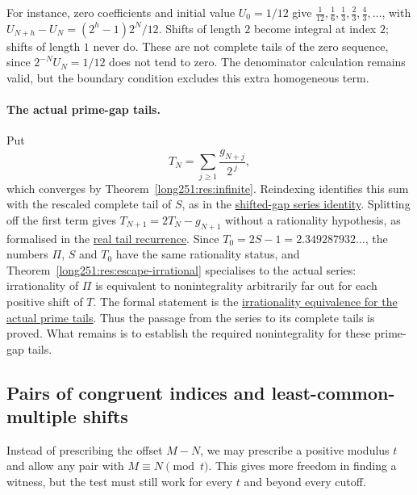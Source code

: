 \documentclass[11pt]{article}
\makeatletter
\newcommand{\compatlabel}[1]{\ltx@label{#1}}
\makeatother
\begin{document}
For instance, zero coefficients and initial value $U_0=1/12$ give
$\tfrac1{12},\tfrac16,\tfrac13,\tfrac23,\tfrac43,\ldots$, with
$U_{N+h}-U_N=(2^h-1)2^N/12$.  Shifts of length $2$ become integral
at index $2$; shifts of length $1$ never do.  These are not complete
tails of the zero sequence, since $2^{-N}U_N=1/12$ does not tend to
zero.  The denominator calculation remains valid, but the boundary
condition excludes this extra homogeneous term.

\paragraph{The actual prime-gap tails.}
Put
\[
 T_N=\sum_{j\ge1}\frac{g_{N+j}}{2^{\,j}},
\]
which converges by Theorem~\ref{long251:res:infinite}.  Reindexing identifies
this sum with the rescaled complete tail of $S$, as in the
\href{https://github.com/wcook04/plectis-erdos/blob/3d6d938d696fed0fb71dd55115a18a73738ff223/lean/ErdosProblems/Erdos251/RealPrimeGapTail.lean\#L31}{shifted-gap
series identity}.  Splitting off the first term gives
$T_{N+1}=2T_N-g_{N+1}$ without a rationality hypothesis, as formalised in the
\href{https://github.com/wcook04/plectis-erdos/blob/3d6d938d696fed0fb71dd55115a18a73738ff223/lean/ErdosProblems/Erdos251/RealPrimeGapTail.lean\#L48}{real
tail recurrence}.  Since $T_0=2S-1=2.349287932\ldots$, the numbers $\Pi$, $S$
and $T_0$ have the same rationality status, and
Theorem~\ref{long251:res:escape-irrational} specialises to the actual series:
irrationality of $\Pi$ is equivalent to nonintegrality arbitrarily far out
for each positive shift of $T$.  The formal statement is the
\href{https://github.com/wcook04/plectis-erdos/blob/3d6d938d696fed0fb71dd55115a18a73738ff223/lean/ErdosProblems/Erdos251/RealPrimeGapTail.lean\#L73}{irrationality equivalence for the actual prime tails}.  Thus the passage from the series to its complete tails
is proved.  What remains is to establish the required nonintegrality for
these prime-gap tails.

\subsection{Pairs of congruent indices and least-common-multiple shifts}\label{long251:sec:freepair}\compatlabel{sec:diagonal-collapse}

Instead of prescribing the offset $M-N$, we may prescribe a positive
modulus $t$ and allow any pair with $M\equiv N\pmod t$.  This gives
more freedom in finding a witness, but the test must still work for
every $t$ and beyond every cutoff.
\end{document}
